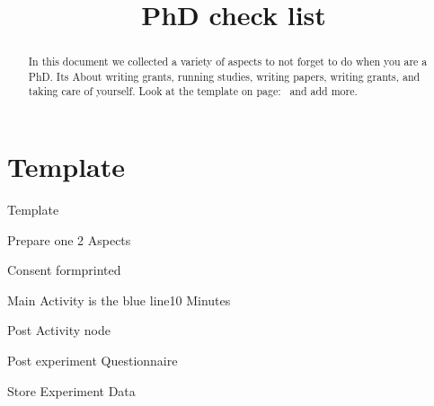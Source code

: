 \documentclass[14pt, a5paper]{extarticle}
\title{PhD check list}
\date{}
\begin{document}
\maketitle
\begin{abstract}
    In this document we collected a variety of aspects to not forget to do when you are a PhD. Its About writing grants, running studies, writing papers, writing grants, and taking care of yourself. Look at the template on page:~\pageref{sec:template} and add more.
\end{abstract}
\tableofcontents
\centering
\newpage










\section{Template} \label{sec:template}
\begin{checklist}{Template}
  \item{Prepare one }{2 Aspects} 
  \item{Consent form}{printed}
  \item{Main Activity is the blue line}{10 Minutes}
  \item{Post Activity node}{}
  \item{Post experiment Questionnaire}{}
  \item{Store Experiment Data}{}
\end{checklist}



\end{document}
